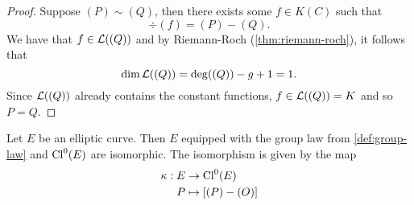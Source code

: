 \begin{proof}
	Suppose $(P) \sim (Q)$, then there exists some $f \in K(C)$ such that
	\begin{equation*}
		\div(f) = (P) - (Q).
	\end{equation*}
	We have that $f \in \mathcal{L}((Q))$ and by Riemann-Roch (\ref{thm:riemann-roch}),
	it follows that
	\begin{equation*}
		\dim \mathcal{L}((Q)) = \deg((Q)) - g + 1 = 1.
	\end{equation*}
	Since $\mathcal{L}((Q))$ already contains the constant functions, $f \in \mathcal{L}((Q)) = K$
	and so $P = Q$.
\end{proof}

\begin{proposition}
	Let $E$ be an elliptic curve. Then $E$ equipped with the group law from 
	\ref{def:group-law}
	and $\operatorname{Cl}^0(E)$ are isomorphic. The isomorphism is given by the map
	\begin{align*}
		\kappa: E &\to \operatorname{Cl}^0(E)\\
		P &\mapsto [(P) - (O)]
	\end{align*}
\end{proposition}

